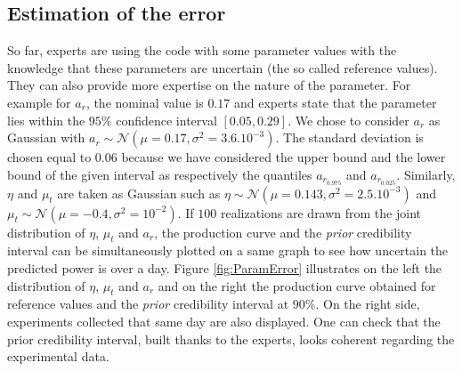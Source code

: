 \documentclass[soumission]{jsfds}
\newcommand{\prior}{\textit{prior }}
\begin{document}
\subsection{Estimation of the error}

So far, experts are using the code with some parameter values with the knowledge that these parameters are uncertain (the so called reference values). They can also provide more expertise on the nature of the parameter. For example for $a_r$, the nominal value is $0.17$ and experts state that the parameter lies within the $95\%$ confidence interval $[0.05,0.29]$. We chose to consider $a_r$ as Gaussian with $a_r\sim\mathcal{N}(\mu=0.17,\sigma^2=3.6.10^{-3})$. The standard deviation is chosen equal to $0.06$ because we have considered the upper bound and the lower bound of the given interval as respectively the quantiles $a_{r_{0.975}}$ and $a_{r_{0.025}}$. Similarly, $\eta$ and $\mu_t$ are taken as Gaussian such as $\eta\sim\mathcal{N}(\mu=0.143,\sigma^2=2.5.10^{-3})$ and $\mu_t\sim\mathcal{N}(\mu=-0.4,\sigma^2=10^{-2})$. If $100$ realizations are drawn from the joint distribution of $\eta$, $\mu_t$ and $a_r$, the production curve and the \textit{prior} credibility interval can be simultaneously plotted on a same graph to see how uncertain the predicted power is over a day. Figure \ref{fig:ParamError} illustrates on the left the distribution of $\eta$, $\mu_t$ and $a_r$ and on the right the production curve obtained for reference values and the \prior credibility interval at $90\%$. On the right side, experiments collected that same day are also displayed. One can check that the prior credibility interval, built thanks to the experts, looks coherent regarding the experimental data.\newline  
\end{document}
